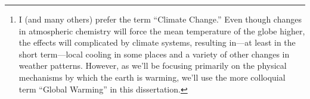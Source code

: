 \documentclass[12pt]{myucthesis}
\begin{document}
\ssp %
\hypersetup{pageanchor=false}

\maketitle
\copyrightpage

\begin{abstract}

Global Warming\footnote{I (and many others) prefer the term “Climate Change.”
    Even though changes in atmospheric chemistry will force the mean temperature
    of the globe higher, the effects will complicated by climate systems,
    resulting in---at least in the short term---local cooling in some places and
    a variety of other changes in weather patterns. However, as we'll be
    focusing primarily on the physical mechanisms by which the earth is warming,
    we'll use the more colloquial term “Global Warming” in this dissertation.}
(“GW”) is easily one of the most pressing concerns of our time, and its solution
will come about only through a change in human behavior.  Compared to the
residents of most other nations worldwide, Americans report lower acceptance of
the realities of GW.  In order to address this concern in a free society, U.S.
residents must be convinced or coerced to take the necessary actions. In spite
of the democratic appeal of education, however, climate communicators appear to
be settling on the notion that emotional persuasion is superior to education.


\end{abstract}
\end{document}
